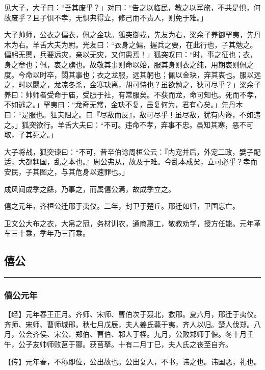\documentclass[]{article}
\begin{document}
见大子，大子曰：``吾其废乎？」对曰：``告之以临民，教之以军旅，不共是惧，何故废乎？且子惧不孝，无惧弗得立，修己而不责人，则免于难。」

大子帅师，公衣之偏衣，佩之金玦。狐突御戎，先友为右，梁余子养御罕夷，先丹木为右。羊舌大夫为尉。光友曰：``衣身之偏，握兵之要，在此行也，子其勉之。偏躬无慝，兵要远灾，亲以无灾，又何患焉！」狐突叹曰：``时，事之征也；衣，身之章也；佩，衷之旗也。故敬其事则命以始，服其身则衣之纯，用期衷则佩之度。今命以时卒，閟其事也；衣之龙服，远其躬也；佩以金玦，弃其衷也。服以远之，时以閟之，龙凉冬杀，金寒玦离，胡可恃也？虽欲勉之，狄可尽乎？」梁余子养曰：帅师者受命于庙，受脤于社，有常服矣。不获而龙，命可知也。死而不孝，不如逃之。」罕夷曰：``龙奇无常，金玦不复，虽复何为，君有心矣。」先丹木曰：``是服也。狂夫阻之。曰『尽敌而反』，敌可尽乎！虽尽敌，犹有内谗，不如违之。」狐突欲行。羊舌大夫曰：``不可。违命不孝，弃事不忠。虽知其寒，恶不可取，子其死之。」

大子将战，狐突谏曰：``不可，昔辛伯谂周桓公云：『内宠并后，外宠二政，嬖子配适，大都耦国，乱之本也。』周公弗从，故及于难。今乱本成矣，立可必乎？孝而安民，子其图之，与其危身以速罪也。」

成风闻成季之繇，乃事之，而属僖公焉，故成季立之。

僖之元年，齐桓公迁邢于夷仪。二年，封卫于楚丘。邢迁如归，卫国忘亡。

卫文公大布之衣，大帛之冠，务材训农，通商惠工，敬教劝学，授方任能。元年革车三十乘，季年乃三百乘。

\hypertarget{header-n646}{%
\subsection{僖公}\label{header-n646}}

\begin{center}\rule{0.5\linewidth}{\linethickness}\end{center}

\hypertarget{header-n648}{%
\subsubsection{僖公元年 }\label{header-n648}}

【经】元年春王正月。齐师、宋师、曹伯次于聂北，救邢。夏六月，邢迁于夷仪。齐师、宋师、曹师城邢。秋七月戊辰，夫人姜氏薨于夷，齐人以归。楚人伐郑。八月，公会齐侯、宋公、郑伯、曹伯、邾人于柽。九月，公败邾师于偃。冬十月壬午，公子友帅师败莒于郦。获莒拏。十有二月丁巳，夫人氏之丧至自齐。

【传】元年春，不称即位，公出故也。公出复入，不书，讳之也。讳国恶，礼也。
\end{document}
